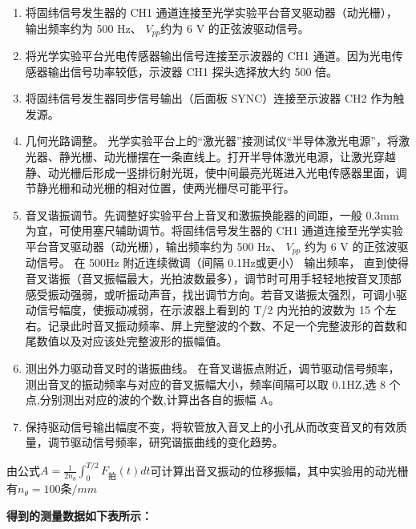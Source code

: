 \documentclass[dvipsnames, svgnames,a4paper,11pt]{article}
\begin{document}
	\begin{enumerate}
		\item 将固纬信号发生器的 CH1 通道连接至光学实验平台音叉驱动器（动光栅）， 输出频率约为 500 Hz、 $V_{pp} $约为 6 V 的正弦波驱动信号。
		\item 将光学实验平台光电传感器输出信号连接至示波器的 CH1 通道。因为光电传感器输出信号功率较低，示波器 CH1 探头选择放大约 500 倍。
		\item 将固纬信号发生器同步信号输出（后面板 SYNC）连接至示波器 CH2 作为触发源。
		\item 几何光路调整。 光学实验平台上的“激光器”接测试仪“半导体激光电源”，将激光器、静光栅、动光栅摆在一条直线上。打开半导体激光电源，让激光穿越静、动光栅后形成一竖排衍射光斑，使中间最亮光斑进入光电传感器里面，调节静光栅和动光栅的相对位置，使两光栅尽可能平行。
		\item 音叉谐振调节。先调整好实验平台上音叉和激振换能器的间距，一般 0.3mm 为宜，可使用塞尺辅助调节。将固纬信号发生器的 CH1 通道连接至光学实验平台音叉驱动器（动光栅），输出频率约为 500 Hz、 $V_{pp} $ 约为 6 V 的正弦波驱动信号。 在 500Hz 附近连续微调（间隔 0.1Hz或更小） 输出频率， 直到使得音叉谐振（音叉振幅最大，光拍波数最多），调节时可用手轻轻地按音叉顶部感受振动强弱，或听振动声音，找出调节方向。若音叉谐振太强烈，可调小驱动信号幅度，使振动减弱，在示波器上看到的 T/2 内光拍的波数为 15 个左右。记录此时音叉振动频率、屏上完整波的个数、不足一个完整波形的首数和尾数值以及对应该处完整波形的振幅值。
		\item 测出外力驱动音叉时的谐振曲线。 在音叉谐振点附近，调节驱动信号频率，测出音叉的振动频率与对应的音叉振幅大小，频率间隔可以取 0.1HZ,选 8 个点,分别测出对应的波的个数,计算出各自的振幅 A。
		\item 保持驱动信号输出幅度不变，将软管放入音叉上的小孔从而改变音叉的有效质量，调节驱动信号频率，研究谐振曲线的变化趋势。
	\end{enumerate}

	由公式$ A =\frac{1}{2n_\theta} \int_0^{T/2} F_{拍}(t)  dt $可计算出音叉振动的位移振幅，其中实验用的动光栅有$n_\theta=100条/mm$


	\textbf{得到的测量数据如下表所示：}
		
\end{document}

